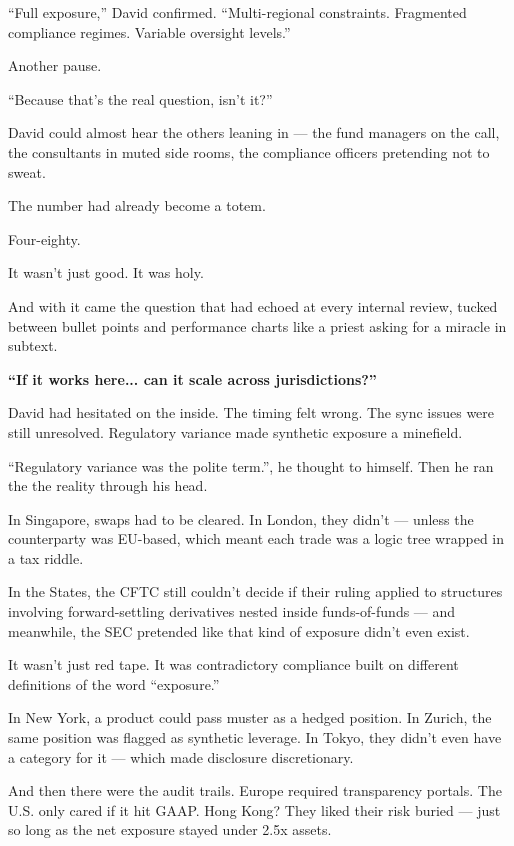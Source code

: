 “Full exposure,” David confirmed. “Multi-regional constraints. Fragmented compliance regimes. Variable oversight levels.”

Another pause.

“Because that’s the real question, isn’t it?”

David could almost hear the others leaning in — the fund managers on the call, the consultants in muted side rooms, the compliance officers pretending not to sweat.

The number had already become a totem.

Four-eighty.

It wasn’t just good. It was holy.

And with it came the question that had echoed at every internal review, tucked between bullet points and performance charts like a priest asking for a miracle in subtext.

\textbf{“If it works here... can it scale across jurisdictions?”}

David had hesitated on the inside.
The timing felt wrong. The sync issues were still unresolved. Regulatory variance made synthetic exposure 
a minefield.

``Regulatory variance was the polite term.'', he thought to himself. Then he ran the
the reality through his head.

\medskip

\begin{tcolorbox}[
    enhanced,
    sharp corners,
    boxrule=0pt,
    colback=gray!3,
    borderline west={2pt}{0pt}{gray!60}, %
    left=10pt,
    right=10pt,
    top=6pt,
    bottom=6pt,
    width=\linewidth,
    fontupper=\small\itshape
  ]
  In Singapore, swaps had to be cleared.  
  In London, they didn’t — unless the counterparty was EU-based, which meant each trade was a logic tree wrapped in a tax riddle.

  \medskip
  
  In the States, the CFTC still couldn’t decide if their ruling applied to structures involving forward-settling derivatives nested inside funds-of-funds —  
  and meanwhile, the SEC pretended like that kind of exposure didn’t even exist.

  \medskip
  
  
  It wasn’t just red tape.  
  It was contradictory compliance built on different definitions of the word “exposure.”

  \medskip
  
  
  In New York, a product could pass muster as a hedged position.  
  In Zurich, the same position was flagged as synthetic leverage.  
  In Tokyo, they didn’t even have a category for it — which made disclosure discretionary.

  \medskip
  
  And then there were the audit trails.  
  Europe required transparency portals.  
  The U.S. only cared if it hit GAAP.  
  Hong Kong? They liked their risk buried — just so long as the net exposure stayed under 2.5x assets.
\end{tcolorbox}
  
